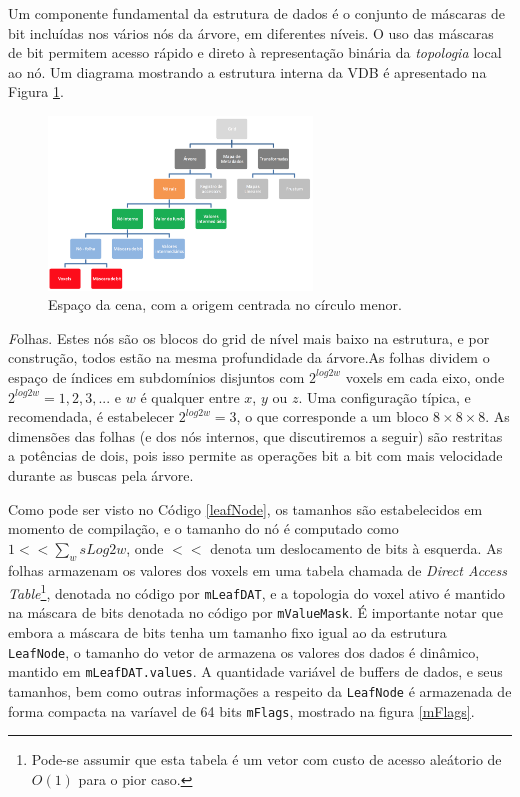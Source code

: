 \documentclass[12pt, a4paper, oneside]{book}
\begin{document}
Um componente fundamental da estrutura de dados é o conjunto de máscaras de bit incluídas nos vários nós da árvore, em diferentes níveis. O uso das máscaras de bit permitem acesso rápido e direto à representação binária da {\it topologia} local ao nó.  Um diagrama mostrando a estrutura interna da VDB é apresentado na Figura \ref{treeStructure}. \\

\begin{figure}[!htb]
\center
\includegraphics[width=7cm]{tree_structure}
\caption{Espaço da cena, com a origem centrada no círculo menor.}
\label{treeStructure}
\end{figure}

{\emph Folhas}. Estes nós são os blocos do grid de nível mais baixo na estrutura, e por construção, todos estão na mesma profundidade da árvore.As folhas dividem o espaço de índices em subdomínios disjuntos com $2^{log2w}$ voxels em cada eixo, onde $2^{log2w} = 1, 2, 3, ...$ e $w$ é qualquer entre $x$, $y$ ou $z$. Uma configuração típica, e recomendada, é estabelecer $2^{log2w} = 3$, o que corresponde a um bloco $8 \times 8 \times 8$. As dimensões das folhas (e dos nós internos, que discutiremos a seguir) são restritas a potências de dois, pois isso permite as operações bit a bit com mais velocidade durante as buscas pela árvore.



Como pode ser visto no Código \ref{leafNode}, os tamanhos são estabelecidos em momento de compilação, e o tamanho do nó é computado como $1 << \sum_{w} sLog2w$, onde $<<$ denota um deslocamento de bits à esquerda. As folhas armazenam os valores dos voxels em uma tabela chamada de {\it Direct Access Table}\footnote{Pode-se assumir que esta tabela é um vetor com custo de acesso aleátorio de $O(1)$ para o pior caso.}, denotada no código por \texttt{mLeafDAT}, e a topologia do voxel ativo é mantido na máscara de bits denotada no código por \texttt{mValueMask}. É importante notar que embora a máscara de bits tenha um tamanho fixo igual ao da estrutura \texttt{LeafNode}, o tamanho do vetor de armazena os valores dos dados é dinâmico, mantido em \texttt{mLeafDAT.values}. A quantidade variável de buffers de dados, e seus tamanhos, bem como outras informações a respeito da \texttt{LeafNode} é armazenada de forma compacta na varíavel de 64 bits \texttt{mFlags}, mostrado na figura \ref{mFlags}.
\end{document}
